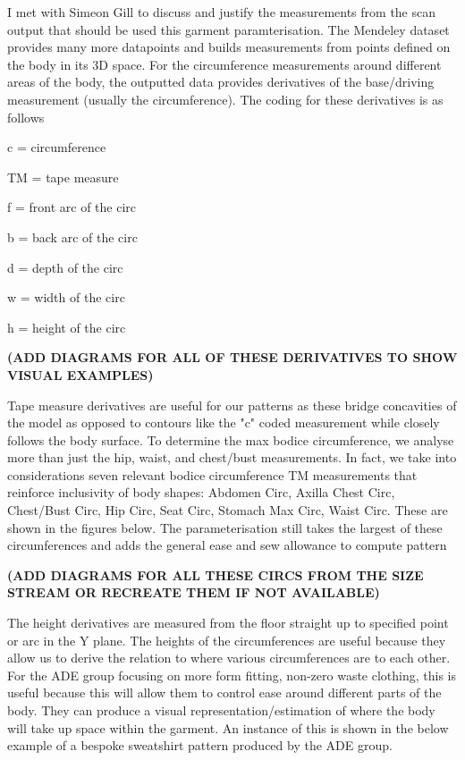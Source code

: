 I met with Simeon Gill to discuss and justify the measurements from the scan output that should be used this garment paramterisation. The Mendeley dataset provides many more datapoints and builds measurements from points defined on the body in its 3D space. For the circumference measurements around different areas of the body, the outputted data provides derivatives of the base/driving measurement (usually the circumference). The coding for these derivatives is as follows

c = circumference

TM = tape measure

f = front arc of the circ

b = back arc of the circ

d = depth of the circ

w = width of the circ

h = height of the circ

\textbf{(ADD DIAGRAMS FOR ALL OF THESE DERIVATIVES TO SHOW VISUAL EXAMPLES)}

Tape measure derivatives are useful for our patterns as these bridge concavities of the model as opposed to contours like the "c" coded measurement while closely follows the body surface. To determine the max bodice circumference, we analyse more than just the hip, waist, and chest/bust measurements. In fact, we take into considerations seven relevant bodice circumference TM measurements that reinforce inclusivity of body shapes: Abdomen Circ, Axilla Chest Circ, Chest/Bust Circ, Hip Circ, Seat Circ, Stomach Max Circ, Waist Circ. These are shown in the figures below. The parameterisation still takes the largest of these circumferences and adds the general ease and sew allowance to compute pattern 

\textbf{(ADD DIAGRAMS FOR ALL THESE CIRCS FROM THE SIZE STREAM OR RECREATE THEM IF NOT AVAILABLE)}

The height derivatives are measured from the floor straight up to specified point or arc in the Y plane. The heights of the circumferences are useful because they allow us to derive the relation to where various circumferences are to each other. For the ADE group focusing on more form fitting, non-zero waste clothing, this is useful because this will allow them to control ease around different parts of the body. They can produce a visual representation/estimation of where the body will take up space within the garment. An instance of this is shown in the below example of a bespoke sweatshirt pattern produced by the ADE group. 

